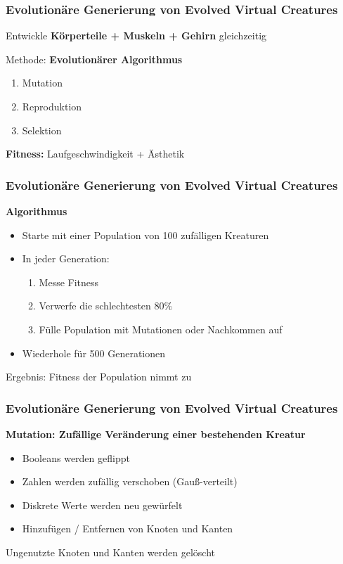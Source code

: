 \documentclass{beamer}
\begin{document}
\begin{frame}
	\frametitle{Evolutionäre Generierung von Evolved Virtual Creatures}
	Entwickle \textbf{Körperteile + Muskeln + Gehirn} gleichzeitig\\ \pause
	\vspace{2em}
	
	Methode: \textbf{Evolutionärer Algorithmus} \pause
	\begin{enumerate}
		\item Mutation
		\item Reproduktion
		\item Selektion
	\end{enumerate}
	\pause
	\vspace{2em}
	\textbf{Fitness:} Laufgeschwindigkeit \pause  + Ästhetik
\end{frame}

\begin{frame}
	\frametitle{Evolutionäre Generierung von Evolved Virtual Creatures}
	\textbf{Algorithmus}\\
	\vspace{1em}
	
	\begin{itemize}
		\item Starte mit einer Population von 100 zufälligen Kreaturen \\
		\vspace{1em}
		\item In jeder Generation:
		\begin{enumerate}
			\item Messe Fitness
			\item Verwerfe die schlechtesten $80\%$
			\item Fülle Population mit Mutationen oder Nachkommen auf
		\end{enumerate}
		\vspace{1em}
		\item Wiederhole für 500 Generationen\\
	\end{itemize}
	\vspace{2em}
	Ergebnis: Fitness der Population nimmt zu \checkmark
\end{frame}

\begin{frame}
	\frametitle{Evolutionäre Generierung von Evolved Virtual Creatures}
	
	\textbf{Mutation: Zufällige Veränderung einer bestehenden Kreatur}
	\vspace{1em}
	\begin{itemize}
		\item Booleans werden geflippt
		\item Zahlen werden zufällig verschoben (Gauß-verteilt)
		\item Diskrete Werte werden neu gewürfelt
		\item Hinzufügen / Entfernen von Knoten und Kanten
	\end{itemize}
	\vspace{2em}
	Ungenutzte Knoten und Kanten werden gelöscht
\end{frame}
\end{document}
